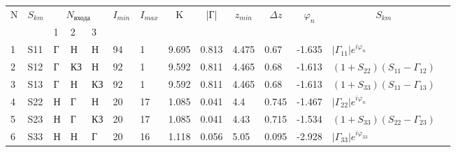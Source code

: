 \begin{tabular}{|l|l|l|l|l|l|l|l|l|l|l|l|l|l}
\cline{1-13}
\multicolumn{1}{|c|}{\multirow{2}{*}{N}} & 
\multicolumn{1}{c|}{\multirow{2}{*}{$S_{km}$}} & 
\multicolumn{3}{c|}{$N_{\text{входа}}$} & 
\multicolumn{1}{c|}{\multirow{2}{*}{$I_{min}$}} & 
\multicolumn{1}{c|}{\multirow{2}{*}{$I_{max}$}} & 
\multicolumn{1}{c|}{\multirow{2}{*}{K}} &
\multicolumn{1}{c|}{\multirow{2}{*}{|Г|}} & 
\multicolumn{1}{c|}{\multirow{2}{*}{$z_{min}$}} & 
\multicolumn{1}{c|}{\multirow{2}{*}{$\Delta z$}} & 
\multicolumn{1}{c|}{\multirow{2}{*}{$\varphi_n$}} & 
\multicolumn{1}{c|}{\multirow{2}{*}{$S_{km}$}} &  \\ \cline{3-5}
\multicolumn{1}{|c|}{} & 
\multicolumn{1}{c|}{}        & 
1&2&3& \multicolumn{1}{c|}{}&\multicolumn{1}{c|}{}&
\multicolumn{1}{c|}{}&\multicolumn{1}{c|}{}& 
\multicolumn{1}{c|}{}&\multicolumn{1}{c|}{}& 
\multicolumn{1}{c|}{}&\multicolumn{1}{c|}{}& \\ \cline{1-13}
1 & S11 & Г & Н & Н  & 94 & 1 & 9.695 & 0.813 & 4.475 & 0.67  & -1.635 & $|\Gamma_{11}|e^{i\varphi_n}$    &  \\ \cline{1-13}
2 & S12 & Г & КЗ & Н & 92 & 1 & 9.592 & 0.811 & 4.465 & 0.68  & -1.613 & $(1+S_{22})(S_{11}-\Gamma_{12})$ &  \\ \cline{1-13}
3 & S13 & Г & Н & КЗ & 92 & 1 & 9.592 & 0.811 & 4.465 & 0.68  & -1.613 & $(1+S_{33})(S_{11}-\Gamma_{13})$ &  \\ \cline{1-13}
4 & S22 & Н & Г & Н  & 20 & 17& 1.085 & 0.041 & 4.4 & 0.745 & -1.467 & $|\Gamma_{22}|e^{i\varphi_n}$    &  \\ \cline{1-13}
5 & S23 & Н & Г & КЗ & 20 & 17 & 1.085 & 0.041 & 4.43  & 0.715 & -1.534 & $(1+S_{33})(S_{22}-\Gamma_{23})$ &  \\ \cline{1-13}
6 & S33 & Н & Н & Г  & 20 & 16 & 1.118 & 0.056 & 5.05  & 0.095 & -2.928 & $|\Gamma_{33}|e^{i\varphi_{33}}$ &  \\ \cline{1-13}
\end{tabular}

